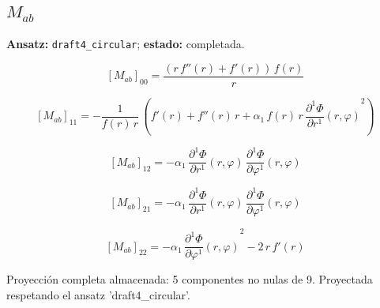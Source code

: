 \documentclass[11pt]{article}
\begin{document}
\subsection*{$ M_{ab} $}
\textbf{Ansatz:} \texttt{draft4\_circular}; \textbf{estado:} completada.\par
\begin{dmath*}[breakdepth={5}]
\left[M_{ab}\right]_{00} = \frac{\left(r\,f''\!\left(r\right) + f'\!\left(r\right)\right)\,f\!\left(r\right)}{r}
\end{dmath*}
\par\smallskip
\begin{dmath*}[breakdepth={5}]
\left[M_{ab}\right]_{11} = -\frac{1}{f\!\left(r\right)\,r}\,\left(f'\!\left(r\right) + f''\!\left(r\right)\,r + \alpha_{1}\,f\!\left(r\right)\,r\,{\frac{\partial^{1} \Phi}{\partial r^{1}}\!\left(r, \varphi\right)}^{2}\right)
\end{dmath*}
\par\smallskip
\begin{dmath*}[breakdepth={5}]
\left[M_{ab}\right]_{12} = -\alpha_{1}\,\frac{\partial^{1} \Phi}{\partial r^{1}}\!\left(r, \varphi\right)\,\frac{\partial^{1} \Phi}{\partial \varphi^{1}}\!\left(r, \varphi\right)
\end{dmath*}
\par\smallskip
\begin{dmath*}[breakdepth={5}]
\left[M_{ab}\right]_{21} = -\alpha_{1}\,\frac{\partial^{1} \Phi}{\partial r^{1}}\!\left(r, \varphi\right)\,\frac{\partial^{1} \Phi}{\partial \varphi^{1}}\!\left(r, \varphi\right)
\end{dmath*}
\par\smallskip
\begin{dmath*}[breakdepth={5}]
\left[M_{ab}\right]_{22} = -\alpha_{1}\,{\frac{\partial^{1} \Phi}{\partial \varphi^{1}}\!\left(r, \varphi\right)}^{2} - 2\,r\,f'\!\left(r\right)
\end{dmath*}
\par\smallskip
Proyección completa almacenada: 5 componentes no nulas de 9. Proyectada respetando el ansatz 'draft4\_circular'.\par\medskip
{}
\end{document}
